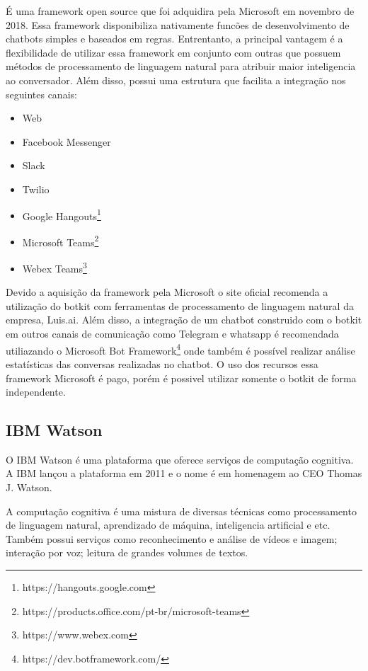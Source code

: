 É uma framework open source que foi adquidira pela Microsoft em novembro de 2018. Essa framework disponibiliza nativamente funcões de desenvolvimento de chatbots simples e baseados em regras. Entrentanto, a principal vantagem é a flexibilidade de utilizar essa framework em conjunto com outras que possuem métodos de processamento de linguagem natural para atribuir maior inteligencia ao conversador. Além disso, possui uma estrutura que facilita a integração nos seguintes canais:

\begin{itemize}
    \item Web
    \item Facebook Messenger
    \item Slack
    \item Twilio
    \item Google Hangouts\footnote{https://hangouts.google.com}
    \item Microsoft Teams\footnote{https://products.office.com/pt-br/microsoft-teams}
    \item Webex Teams\footnote{https://www.webex.com}
\end{itemize}


Devido a aquisição da framework pela Microsoft o site oficial recomenda a utilização do botkit com ferramentas de processamento de linguagem natural  da empresa, Luis.ai. Além disso,  a integração de um chatbot construido com o botkit em outros canais de comunicação como Telegram e whatsapp é recomendada utiliazando o Microsoft Bot Framework\footnote{https://dev.botframework.com/} onde também é possível realizar análise estatísticas das conversas realizadas no chatbot. O uso dos recursos essa framework Microsoft é pago, porém é possivel utilizar somente o botkit de forma independente.

\subsection{IBM Watson}

O IBM Watson é uma plataforma que oferece serviços de computação cognitiva. A IBM lançou a plataforma em 2011 e o nome é em homenagem ao  CEO Thomas J. Watson.

A computação cognitiva é uma mistura de diversas técnicas como processamento de linguagem natural, aprendizado de máquina, inteligencia artificial e etc. Também possui serviços como reconhecimento e análise de vídeos e imagem; interação por voz; leitura de grandes volumes de textos.

